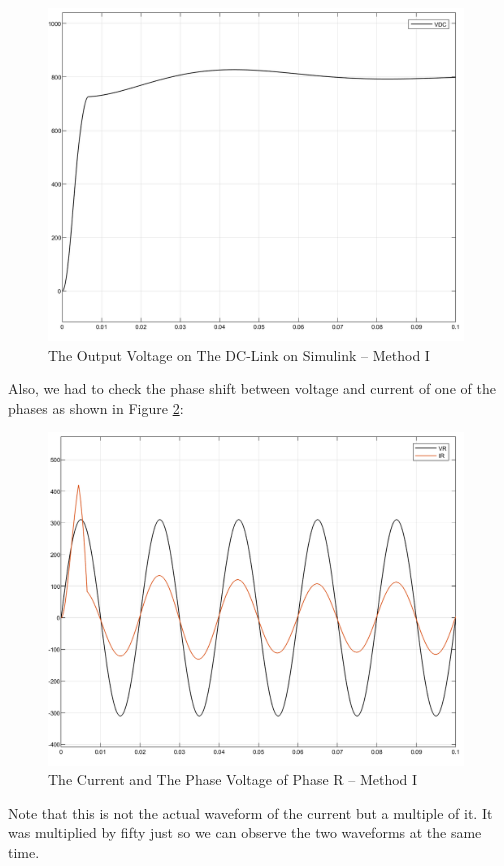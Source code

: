 \documentclass[12pt,a4paper]{book}
\begin{document}
\begin{figure}[h!]
  \centering
  \includegraphics[width=11cm]{image20.png}
  \caption{The Output Voltage on The DC-Link on Simulink -- Method I}
  \label{fig:image20}
\end{figure}
Also, we had to check the phase shift between voltage and current of one of the phases as shown in Figure \ref{fig:image21}:

\begin{figure}[h!]
  \centering
  \includegraphics[width=11cm]{image21.png}
  \caption{The Current and The Phase Voltage of Phase R -- Method I}
  \label{fig:image21}
\end{figure}
Note that this is not the actual waveform of the current but a multiple of it. It was multiplied by fifty just so we can observe the two waveforms at the same time.
\end{document}
